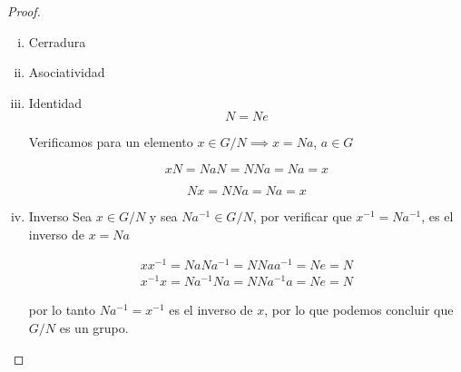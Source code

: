 	\begin{proof}
		\begin{enumerate}[i)]
			\item Cerradura

			\item Asociatividad

			\item Identidad
			\begin{equation}
				N = N e
			\end{equation}

			Verificamos para un elemento $x \in G/N \implies x = N a$, $a\in G$

			\begin{equation}
				x N = N a N = N N a = N a = x \nonumber
			\end{equation}

			\begin{equation}
				N x = N N a = N a = x
			\end{equation}
			\item Inverso
			Sea $x \in G/N$ y sea $N a^{-1} \in G/N$, por verificar que $x^{-1} = N a^{-1}$, es el inverso de $x = N a$

			\begin{eqnarray}
				x x^{-1} = N a N a^{-1} = N N a a^{-1} = N e = N \\
				x^{-1} x = N a^{-1} N a = N N a^{-1} a = N e = N
			\end{eqnarray}

			por lo tanto $N a^{-1} = x^{-1}$ es el inverso de $x$, por lo que podemos concluir que $G/N$ es un grupo.

		\end{enumerate}
	\end{proof}
